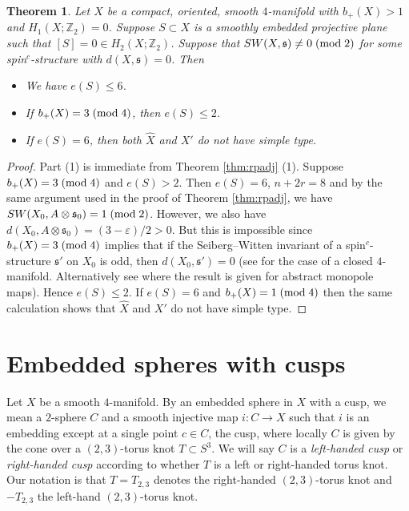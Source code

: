 \documentclass{amsart}
\newtheorem{theorem}{Theorem}[section]
\theoremstyle{definition}
\theoremstyle{remark}
\numberwithin{equation}{section}
\begin{document}
\begin{theorem}
Let $X$ be a compact, oriented, smooth $4$-manifold with $b_+(X) > 1$ and $H_1(X ; \mathbb{Z}_2) = 0$. Suppose $S \subset X$ is a smoothly embedded projective plane such that $[S] = 0 \in H_2(X ; \mathbb{Z}_2)$. Suppose that $SW(X , \mathfrak{s}) \neq 0 \; ({\rm mod} \; 2)$ for some spin$^c$-structure with $d(X , \mathfrak{s}) = 0$. Then 
\begin{itemize}
\item[(1)]{We have $e(S) \le 6$.}
\item[(2)]{If $b_+(X) = 3 \; ({\rm mod} \; 4)$, then $e(S) \le 2$.}
\item[(3)]{If $e(S) = 6$, then both $\widehat{X}$ and $X'$ do not have simple type.}
\end{itemize}
\end{theorem}
\begin{proof}
Part (1) is immediate from Theorem \ref{thm:rpadj} (1). Suppose $b_+(X) = 3 \; ({\rm mod} \; 4)$ and $e(S) > 2$. Then $e(S) = 6$, $n+2r = 8$ and by the same argument used in the proof of Theorem \ref{thm:rpadj}, we have $SW(X_0 , A \otimes \mathfrak{s}_0) = 1 \; ({\rm mod} \; 2)$. However, we also have $d(X_0 , A \otimes \mathfrak{s}_0) = (3 - \varepsilon)/2 > 0$. But this is impossible since $b_+(X) = 3 \; ({\rm mod} \; 4)$ implies that if the Seiberg--Witten invariant of a spin$^c$-structure $\mathfrak{s}'$ on $X_0$ is odd, then $d(X_0 , \mathfrak{s}') = 0$ (see \cite[Theorem 3.7]{bf} for the case of a closed $4$-manifold. Alternatively see \cite[Theorem 1.8]{bar} where the result is given for abstract monopole maps). Hence $e(S) \le 2$. If $e(S) = 6$ and $b_+(X) = 1 \; ({\rm mod} \; 4)$ then the same calculation shows that $\widehat{X}$ and $X'$ do not have simple type.
\end{proof}




\section{Embedded spheres with cusps}\label{sec:cusp}

Let $X$ be a smooth $4$-manifold. By an embedded sphere in $X$ with a cusp, we mean a $2$-sphere $C$ and a smooth injective map $i : C \to X$ such that $i$ is an embedding except at a single point $c \in C$, the cusp, where locally $C$ is given by the cone over a $(2,3)$-torus knot $T \subset S^3$. We will say $C$ is a {\em left-handed cusp} or {\em right-handed cusp} according to whether $T$ is a left or right-handed torus knot. Our notation is that $T = T_{2,3}$ denotes the right-handed $(2,3)$-torus knot and $-T_{2,3}$ the left-hand $(2,3)$-torus knot.
\end{document}
